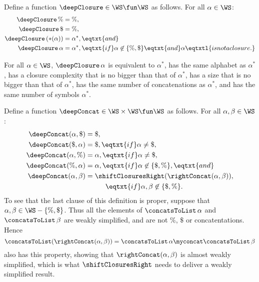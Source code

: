 Define a function $\deepClosure\in\WS\fun\WS$ as follows.  For all
$\alpha\in\WS$:
\begin{align*}
  \deepClosure\,\% &= \% , \\
  \deepClosure\,\$ &= \% , \\
  \deepClosure\,({*}(\alpha)) &= \alpha^* , \eqtxt{and} \\
  \deepClosure\,\alpha &= \alpha^*, \eqtxt{if}
  \alpha\not\in\{\%,\$\} \eqtxt{and} \alpha \eqtxtl{is not a closure.}
\end{align*}

\begin{lemma}
\label{DeepClosureLem}
For all $\alpha\in\WS$, $\deepClosure\,\alpha$ is equivalent to
$\alpha^*$, has the same alphabet as $\alpha^*$, has a closure
complexity that is no bigger than that of $\alpha^*$, has a size that
is no bigger than that of $\alpha^*$, has the same number of
concatenations as $\alpha^*$, and has the same number of symbols
$\alpha^*$.
\end{lemma}

Define a function $\deepConcat\in\WS\times\WS\fun\WS$ as follows.  For all
$\alpha,\beta\in\WS$:
\begin{align*}
  \deepConcat(\alpha, \$) &= \$ , \\
  \deepConcat(\$, \alpha) &= \$ , \eqtxt{if} \alpha\neq\$ , \\
  \deepConcat(\alpha, \%) &= \alpha, \eqtxt{if} \alpha\neq\$ , \\
  \deepConcat(\%, \alpha) &= \alpha, \eqtxt{if} \alpha\not\in\{\$,\%\} ,
  \eqtxt{and} \\
  \deepConcat(\alpha,\beta) &=
    \shiftClosuresRight(\rightConcat(\alpha, \beta)), \\
    &{} \hspace*{1cm}\eqtxt{if}\alpha,\beta\not\in\{\$,\%\} .
\end{align*}
To see that the last clause of this definition is proper, suppose
that $\alpha,\beta\in\WS-\{\%,\$\}$.  Thus all the elements of
$\concatsToList\,\alpha$ and $\concatsToList\,\beta$ are weakly
simplified, and are not $\%$, $\$$ or concatentations.  Hence
\begin{displaymath}
\concatsToList(\rightConcat(\alpha,\beta)) =  
\concatsToList\,\alpha \myconcat \concatsToList\,\beta
\end{displaymath}
also has this property, showing that $\rightConcat(\alpha,\beta)$
is almost weakly simplified, which is what $\shiftClosuresRight$
needs to deliver a weakly simplified result.

